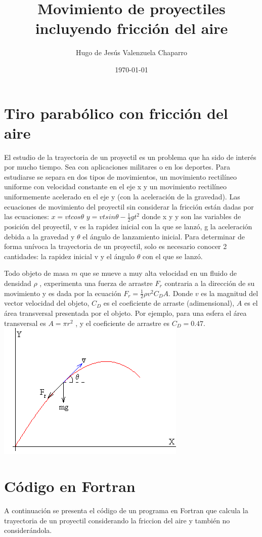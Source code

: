 \documentclass[notitlepage,12pt]{article}
\title{Movimiento de proyectiles incluyendo fricci\'on del aire}
\author{Hugo de Jes\'us Valenzuela Chaparro}
\date{\today}
\begin{document}
\maketitle

\section{Tiro parab\'olico con fricci\'on del aire}
El estudio de la trayectoria de un proyectil es un problema que ha sido de inter\'es por mucho tiempo. Sea 
con aplicaciones militares o en los deportes. Para estudiarse se separa en dos tipos de movimientos, un
movimiento rectil\'ineo uniforme con velocidad constante en el eje x y un movimiento rectil\'ineo uniformemente
acelerado en el eje y (con la aceleraci\'on de la gravedad). Las ecuaciones de movimiento del proyectil sin considerar
la fricción están dadas por las ecuaciones:
$x=vtcos\theta$
$y=vtsin\theta-\frac{1}{2}gt^2$
donde x y y son las variables de posición del proyectil, v es la rapidez inicial con la que se lanzó, g la aceleración 
debida a la gravedad y $\theta$ el \'angulo de lanzamiento inicial. Para determinar de forma unívoca la trayectoria de un proyectil, 
solo es necesario conocer 2 cantidades: la rapidez inicial v y el ángulo $\theta$  con el que se lanzó.

Todo objeto de masa $m$ que se mueve a muy alta velocidad en un fluido de densidad $\rho$ ,  experimenta una fuerza de arrastre $F_r$ 
contraria a la dirección de su movimiento y es  dada por la ecuación $F_r=\frac{1}{2}\rho v^2C_DA$. Donde $v$ es la magnitud del vector 
velocidad del objeto, $C_D$ es  el coeficiente de arraste (adimensional), $A$ es el área transversal presentada por el objeto. 
Por ejemplo, para una esfera el área transversal es $A=\pi r^2$ , y  el coeficiente de arrastre es $C_D=0.47$.
\includegraphics{parabolicfriction}


\section{C\'odigo en Fortran}
A continuaci\'on se presenta el c\'odigo de un programa en Fortran que calcula la trayectoria de un proyectil considerando la friccion
del aire y tambi\'en no consider\'andola.
\end{document}

